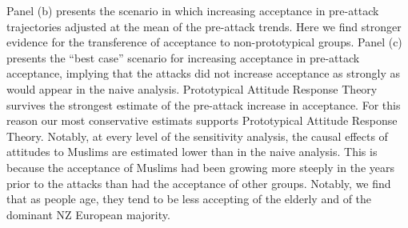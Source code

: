 \documentclass[
  singlecolumn]{report}
\begin{document}
Panel (b) presents the scenario in which increasing acceptance in
pre-attack trajectories adjusted at the mean of the pre-attack trends.
Here we find stronger evidence for the transference of acceptance to
non-prototypical groups. Panel (c) presents the ``best case'' scenario
for increasing acceptance in pre-attack acceptance, implying that the
attacks did not increase acceptance as strongly as would appear in the
naive analysis. Prototypical Attitude Response Theory survives the
strongest estimate of the pre-attack increase in acceptance. For this
reason our most conservative estimats supports Prototypical Attitude
Response Theory. Notably, at every level of the sensitivity analysis,
the causal effects of attitudes to Muslims are estimated lower than in
the naive analysis. This is because the acceptance of Muslims had been
growing more steeply in the years prior to the attacks than had the
acceptance of other groups. Notably, we find that as people age, they
tend to be less accepting of the elderly and of the dominant NZ European
majority.
\end{document}
